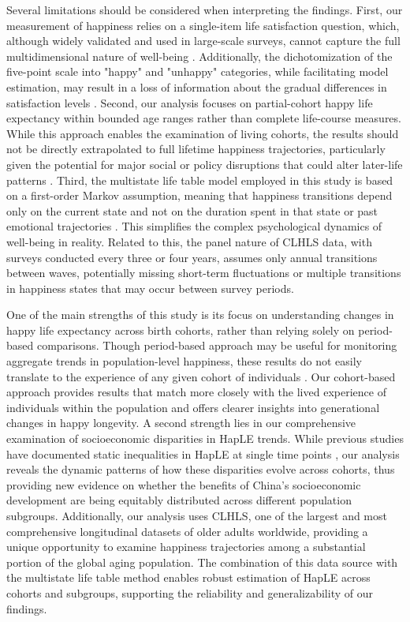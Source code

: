 \documentclass[12pt, a4paper]{article}
\begin{document}
Several limitations should be considered when interpreting the findings. First, our measurement of happiness relies on a single-item life satisfaction question, which, although widely validated and used in large-scale surveys, cannot capture the full multidimensional nature of well-being \autocite{george.2010.still}. Additionally, the dichotomization of the five-point scale into "happy" and "unhappy" categories, while facilitating model estimation, may result in a loss of information about the gradual differences in satisfaction levels \autocite{wan.2024.socioeconomic}. Second, our analysis focuses on partial-cohort happy life expectancy within bounded age ranges rather than complete life-course measures. While this approach enables the examination of living cohorts, the results should not be directly extrapolated to full lifetime happiness trajectories, particularly given the potential for major social or policy disruptions that could alter later-life patterns \autocite{payne.2022.expansion}. Third, the multistate life table model employed in this study is based on a first-order Markov assumption, meaning that happiness transitions depend only on the current state and not on the duration spent in that state or past emotional trajectories \autocite{payne.2022.expansion,shen.2023.disability}. This simplifies the complex psychological dynamics of well-being in reality. Related to this, the panel nature of CLHLS data, with surveys conducted every three or four years, assumes only annual transitions between waves, potentially missing short-term fluctuations or multiple transitions in happiness states that may occur between survey periods.

One of the main strengths of this study is its focus on understanding changes in happy life expectancy across birth cohorts, rather than relying solely on period-based comparisons. Though period-based approach may be useful for monitoring aggregate trends in population-level happiness, these results do not easily translate to the experience of any given cohort of individuals \autocite{payne.2022.expansion}. Our cohort-based approach provides results that match more closely with the lived experience of individuals within the population and offers clearer insights into generational changes in happy longevity. A second strength lies in our comprehensive examination of socioeconomic disparities in HapLE trends. While previous studies have documented static inequalities in HapLE at single time points \autocite{wan.2024.socioeconomic}, our analysis reveals the dynamic patterns of how these disparities evolve across cohorts, thus providing new evidence on whether the benefits of China's socioeconomic development are being equitably distributed across different population subgroups. Additionally, our analysis uses CLHLS, one of the largest and most comprehensive longitudinal datasets of older adults worldwide, providing a unique opportunity to examine happiness trajectories among a substantial portion of the global aging population. The combination of this data source with the multistate life table method enables robust estimation of HapLE across cohorts and subgroups, supporting the reliability and generalizability of our findings.
\end{document}
